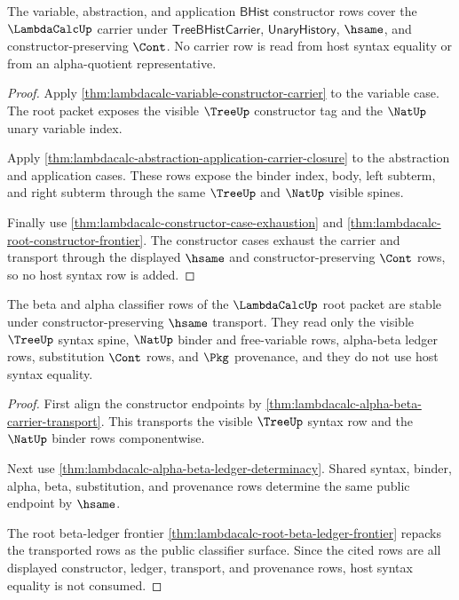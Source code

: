 \begin{theorem}
\label{thm:lambdacalc-root-obligation-carrier}
The variable, abstraction, and application $\mathsf{BHist}$ constructor rows
cover the $\LambdaCalcUp$ carrier under
$\mathsf{TreeBHistCarrier}$, $\mathsf{UnaryHistory}$, $\hsame$, and
constructor-preserving $\Cont$. No carrier row is read from host syntax
equality or from an alpha-quotient representative.
\end{theorem}
\begin{proof}
Apply \autoref{thm:lambdacalc-variable-constructor-carrier} to the variable
case. The root packet exposes the visible $\TreeUp$ constructor tag and the
$\NatUp$ unary variable index.

Apply \autoref{thm:lambdacalc-abstraction-application-carrier-closure} to the
abstraction and application cases. These rows expose the binder index, body,
left subterm, and right subterm through the same $\TreeUp$ and $\NatUp$ visible
spines.

Finally use \autoref{thm:lambdacalc-constructor-case-exhaustion} and
\autoref{thm:lambdacalc-root-constructor-frontier}. The constructor cases
exhaust the carrier and transport through the displayed $\hsame$ and
constructor-preserving $\Cont$ rows, so no host syntax row is added.
\end{proof}

\begin{theorem}
\label{thm:lambdacalc-root-obligation-classifier}
The beta and alpha classifier rows of the $\LambdaCalcUp$ root packet are
stable under constructor-preserving $\hsame$ transport. They read only the
visible $\TreeUp$ syntax spine, $\NatUp$ binder and free-variable rows,
alpha-beta ledger rows, substitution $\Cont$ rows, and $\Pkg$ provenance, and
they do not use host syntax equality.
\end{theorem}
\begin{proof}
First align the constructor endpoints by
\autoref{thm:lambdacalc-alpha-beta-carrier-transport}. This transports the
visible $\TreeUp$ syntax row and the $\NatUp$ binder rows componentwise.

Next use \autoref{thm:lambdacalc-alpha-beta-ledger-determinacy}. Shared syntax,
binder, alpha, beta, substitution, and provenance rows determine the same
public endpoint by $\hsame$.

The root beta-ledger frontier
\autoref{thm:lambdacalc-root-beta-ledger-frontier} repacks the transported rows
as the public classifier surface. Since the cited rows are all displayed
constructor, ledger, transport, and provenance rows, host syntax equality is
not consumed.
\end{proof}

